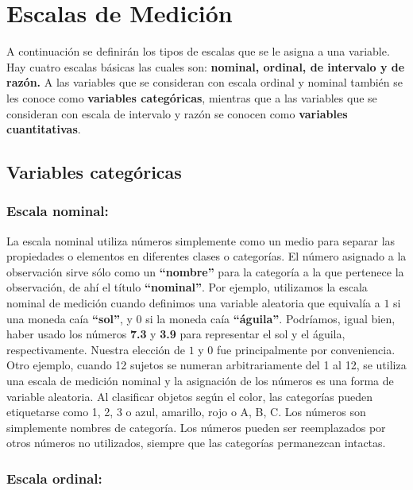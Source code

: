 \documentclass[a4paper,oneside,openany]{book}
\begin{document}
\chapter{\texorpdfstring{Escalas de Medición
\citet{conover1998practical}}{Escalas de Medición @conover1998practical}}\label{escalas-de-mediciuxf3n-conover1998practical}

A continuación se definirán los tipos de escalas que se le asigna a una
variable. Hay cuatro escalas básicas las cuales son: \textbf{nominal,
ordinal, de intervalo y de razón.} A las variables que se consideran con
escala ordinal y nominal también se les conoce como \textbf{variables
categóricas}, mientras que a las variables que se consideran con escala
de intervalo y razón se conocen como \textbf{variables cuantitativas}.

\section{Variables categóricas}\label{variables-categuxf3ricas}

\subsection{Escala nominal:}\label{escala-nominal}

La escala nominal utiliza números simplemente como un medio para separar
las propiedades o elementos en diferentes clases o categorías. El número
asignado a la observación sirve sólo como un \textbf{``nombre''} para la
categoría a la que pertenece la observación, de ahí el título
\textbf{``nominal''}. Por ejemplo, utilizamos la escala nominal de
medición cuando definimos una variable aleatoria que equivalía a \(1\)
si una moneda caía \textbf{``sol''}, y \(0\) si la moneda caía
\textbf{``águila''}. Podríamos, igual bien, haber usado los números
\textbf{7.3} y \textbf{3.9} para representar el sol y el águila,
respectivamente. Nuestra elección de \(1\) y \(0\) fue principalmente
por conveniencia. Otro ejemplo, cuando 12 sujetos se numeran
arbitrariamente del 1 al 12, se utiliza una escala de medición nominal y
la asignación de los números es una forma de variable aleatoria. Al
clasificar objetos según el color, las categorías pueden etiquetarse
como 1, 2, 3 o azul, amarillo, rojo o A, B, C. Los números son
simplemente nombres de categoría. Los números pueden ser reemplazados
por otros números no utilizados, siempre que las categorías permanezcan
intactas.

\subsection{Escala ordinal:}\label{escala-ordinal}
\end{document}
